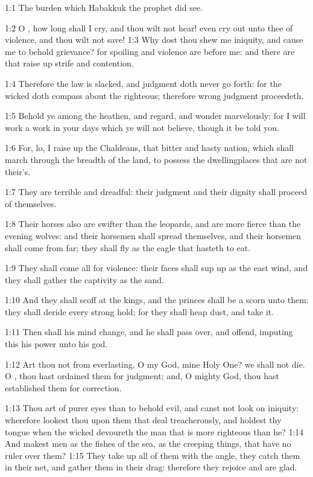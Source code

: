 

1:1 The burden which Habakkuk the prophet did see.

1:2 O \LORD, how long shall I cry, and thou wilt not hear! even cry out unto thee of violence, and thou wilt not save!  1:3 Why dost thou shew me iniquity, and cause me to behold grievance? for spoiling and violence are before me: and there are that raise up strife and contention.

1:4 Therefore the law is slacked, and judgment doth never go forth: for the wicked doth compass about the righteous; therefore wrong judgment proceedeth.

1:5 Behold ye among the heathen, and regard, and wonder marvelously: for I will work a work in your days which ye will not believe, though it be told you.

1:6 For, lo, I raise up the Chaldeans, that bitter and hasty nation, which shall march through the breadth of the land, to possess the dwellingplaces that are not their's.

1:7 They are terrible and dreadful: their judgment and their dignity shall proceed of themselves.

1:8 Their horses also are swifter than the leopards, and are more fierce than the evening wolves: and their horsemen shall spread themselves, and their horsemen shall come from far; they shall fly as the eagle that hasteth to eat.

1:9 They shall come all for violence: their faces shall sup up as the east wind, and they shall gather the captivity as the sand.

1:10 And they shall scoff at the kings, and the princes shall be a scorn unto them: they shall deride every strong hold; for they shall heap dust, and take it.

1:11 Then shall his mind change, and he shall pass over, and offend, imputing this his power unto his god.

1:12 Art thou not from everlasting, O \LORD my God, mine Holy One? we shall not die. O \LORD, thou hast ordained them for judgment; and, O mighty God, thou hast established them for correction.

1:13 Thou art of purer eyes than to behold evil, and canst not look on iniquity: wherefore lookest thou upon them that deal treacherously, and holdest thy tongue when the wicked devoureth the man that is more righteous than he?  1:14 And makest men as the fishes of the sea, as the creeping things, that have no ruler over them?  1:15 They take up all of them with the angle, they catch them in their net, and gather them in their drag: therefore they rejoice and are glad.

